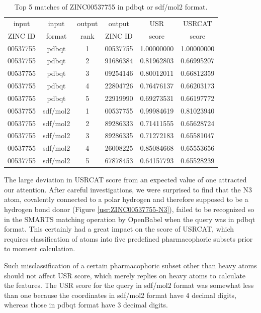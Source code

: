 \begin{table}
\caption{Top 5 matches of ZINC00537755 in pdbqt or sdf/mol2 format.}
\label{usr:ZINC00537755-Top5}
\begin{tabular}{cccccc}
\hline
input    & input  & output & output   & USR   & USRCAT\\
ZINC ID  & format & rank   & ZINC ID  & score & score\\
\hline
00537755 & pdbqt    & 1 & 00537755 & 1.00000000 & 1.00000000\\
00537755 & pdbqt    & 2 & 91686384 & 0.81962803 & 0.66995207\\
00537755 & pdbqt    & 3 & 09254146 & 0.80012011 & 0.66812359\\
00537755 & pdbqt    & 4 & 22804726 & 0.76476137 & 0.66203173\\
00537755 & pdbqt    & 5 & 22919990 & 0.69273531 & 0.66197772\\
00537755 & sdf/mol2 & 1 & 00537755 & 0.99984619 & 0.81023940\\
00537755 & sdf/mol2 & 2 & 89286333 & 0.71411555 & 0.65628724\\
00537755 & sdf/mol2 & 3 & 89286335 & 0.71272183 & 0.65581047\\
00537755 & sdf/mol2 & 4 & 26008225 & 0.85084668 & 0.65553656\\
00537755 & sdf/mol2 & 5 & 67878453 & 0.64157793 & 0.65528239\\
\hline
\end{tabular}
\end{table}

The large deviation in USRCAT score from an expected value of one attracted our attention. After careful investigations, we were surprised to find that the N3 atom, covalently connected to a polar hydrogen and therefore supposed to be a hydrogen bond donor (Figure \ref{usr:ZINC00537755-N3}), failed to be recognized so in the SMARTS matching operation by OpenBabel \citep{968} when the query was in pdbqt format. This certainly had a great impact on the score of USRCAT, which requires classification of atoms into five predefined pharmacophoric subsets prior to moment calculation.

Such misclassification of a certain pharmacophoric subset other than heavy atoms should not affect USR score, which merely replies on heavy atoms to calculate the features. The USR score for the query in sdf/mol2 format was somewhat less than one because the coordinates in sdf/mol2 format have 4 decimal digits, whereas those in pdbqt format have 3 decimal digits.

